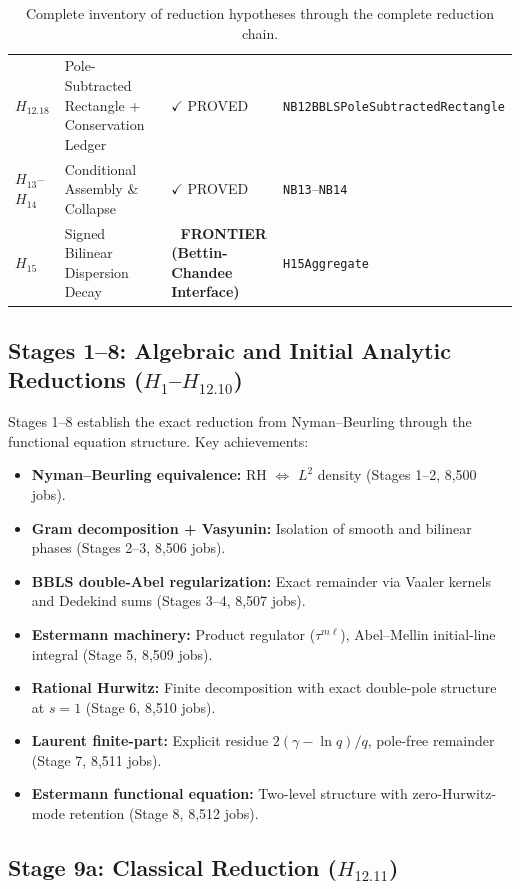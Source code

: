 \documentclass[11pt,a4paper]{article}
\theoremstyle{plain}
\theoremstyle{definition}
\theoremstyle{remark}
\begin{document}
\begin{table}[htbp]
\begin{tabular}{llll}
$H_{12.18}$ & Pole-Subtracted Rectangle + Conservation Ledger & $\checkmark$ PROVED & \texttt{NB12BBLSPoleSubtractedRectangle} \\
$H_{13}$--$H_{14}$ & Conditional Assembly \& Collapse & $\checkmark$ PROVED & \texttt{NB13}--\texttt{NB14} \\
\midrule
$H_{15}$ & Signed Bilinear Dispersion Decay & \textbf{🔑 FRONTIER (Bettin-Chandee Interface)} & \texttt{H15Aggregate} \\
\bottomrule
\end{tabular}
\caption{Complete inventory of reduction hypotheses through the complete reduction chain.}
\label{tab:h_inventory}
\end{table}

\subsection{Stages 1--8: Algebraic and Initial Analytic Reductions ($H_1$--$H_{12.10}$)}

Stages 1--8 establish the exact reduction from Nyman--Beurling through the functional equation structure. Key achievements:

\begin{itemize}[leftmargin=2em]
  \item \textbf{Nyman--Beurling equivalence:} RH $\Leftrightarrow$ $L^2$ density (Stages 1--2, 8,500 jobs).
  \item \textbf{Gram decomposition + Vasyunin:} Isolation of smooth and bilinear phases (Stages 2--3, 8,506 jobs).
  \item \textbf{BBLS double-Abel regularization:} Exact remainder via Vaaler kernels and Dedekind sums (Stages 3--4, 8,507 jobs).
  \item \textbf{Estermann machinery:} Product regulator ($\tau^{m\ell}$), Abel--Mellin initial-line integral (Stage 5, 8,509 jobs).
  \item \textbf{Rational Hurwitz:} Finite decomposition with exact double-pole structure at $s=1$ (Stage 6, 8,510 jobs).
  \item \textbf{Laurent finite-part:} Explicit residue $2(\gamma - \ln q)/q$, pole-free remainder (Stage 7, 8,511 jobs).
  \item \textbf{Estermann functional equation:} Two-level structure with zero-Hurwitz-mode retention (Stage 8, 8,512 jobs).
\end{itemize}

\subsection{Stage 9a: Classical Reduction ($H_{12.11}$)}
\end{document}
